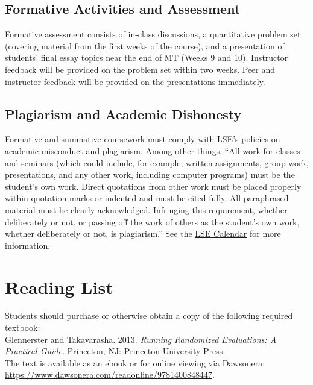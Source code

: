 \documentclass[12pt,a4paper]{article}
\begin{document}
\subsection{Formative Activities and Assessment}

Formative assessment consists of in-class discussions, a quantitative problem set (covering material from the first weeks of the course), and a presentation of students' final essay topics near the end of MT (Weeks 9 and 10). Instructor feedback will be provided on the problem set within two weeks. Peer and instructor feedback will be provided on the presentations immediately.


\subsection{Plagiarism and Academic Dishonesty}

Formative and summative coursework must comply with LSE's policies on academic misconduct and plagiarism. Among other things, ``All work for classes and seminars (which could include, for example, written assignments, group work, presentations, and any other work, including computer programs) must be the student's own work. Direct quotations from other work must be placed properly within quotation marks or indented and must be cited fully. All paraphrased material must be clearly acknowledged. Infringing this requirement, whether deliberately or not, or passing off the work of others as the student's own work, whether deliberately or not, is plagiarism.'' See the \href{http://www.lse.ac.uk/resources/calendar/undergraduate.htm}{LSE Calendar} for more information.



\section{Reading List}

Students should purchase or otherwise obtain a copy of the following required textbook:\\

\noindent Glennerster and Takavarasha. 2013. \textit{Running Randomized Evaluations: A Practical Guide}. Princeton, NJ: Princeton University Press.\\

\noindent The text is available as an ebook or for online viewing via Dawsonera:\\

\url{https://www.dawsonera.com/readonline/9781400848447}.\\
\end{document}
